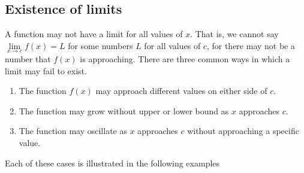 \subsection{Existence of limits}
A function may not have a limit for all values of $x$. That is, we cannot say $\lim\limits_{x\to c}f(x)=L$ for some numbers $L$ for all values of $c$, for there may not be a number that $f(x)$ is approaching. There are three common ways in which a limit may fail to exist. 
\begin{enumerate}
\item		The function $f(x)$ may approach different values on either side of $c$.
\item		The function may grow without upper or lower bound as $x$ approaches $c$.
\item		The function may oscillate as $x$ approaches $c$ without approaching a specific value.
\end{enumerate}

Each of these cases is illustrated in the following examples

